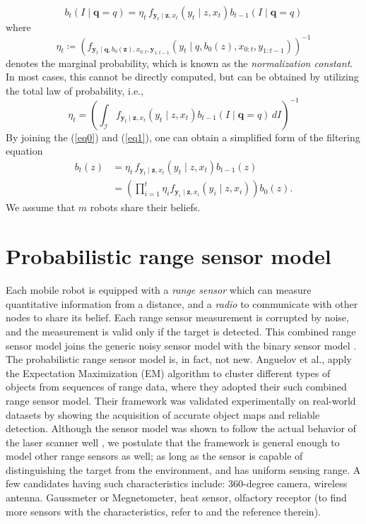 \documentclass[journal]{IEEEtran}
\begin{document}
\begin{equation}
b_{t}(I \mid \bm{q} = q)=
\eta_t\,
	f_{\bm{y}_{t} \mid
		\bm{z},{x}_{t}}\left(
	y_{t} \mid
	z,{x}_{t}\right)
	b_{t-1}(I \mid \bm{q} = q)
	\label{eq1}
\end{equation}
where
\begin{equation}
\eta_{t} \coloneqq
\left(
	f_{\bm{y}_{t} \mid
	\bm{q},
	b_0(\bm{z}),
	{x}_{0:t},\bm{y}_{1:t-1}	
}\left(
y_{t} \mid
q,b_0(z),
{x}_{0:t},y_{1:t-1}
\right)
\right)^{-1}
\nonumber
\end{equation}
denotes the marginal probability, which is known as the \emph{normalization constant}. In most cases, this cannot be directly computed, but can be obtained by utilizing the total law of probability, i.e.,
\[
\eta_{t} =
\left(\int_{\mathcal{I}}
f_{\bm{y}_{t} \mid
	\bm{z},{x}_{t}}\left(
y_{t} \mid
z,{x}_{t}\right)
b_{t-1}(I \mid \bm{q} = q)
\,dI\right)^{-1}
\]
By joining the (\ref{eq0}) and (\ref{eq1}), one can obtain a simplified form of the filtering equation
\begin{align*}
b_t(z) &=
\eta_t\,
f_{\bm{y}_{t} \mid
	\bm{z},{x}_{t}}\left(
y_{t} \mid
z,{x}_{t}\right)
b_{t-1}(z)\\
&=\left(\prod_{i=1}^t
\eta_i
f_{\bm{y}_{i} \mid
	\bm{z},{x}_{i}}\left(
y_{i} \mid
z,{x}_{i}\right) \right)
b_0(z).
\end{align*}
We assume that $m$ robots share their beliefs. 

\section{Probabilistic range sensor model}
\label{sec:sec3}
Each mobile robot is equipped with a \emph{range sensor} which can measure quantitative information from a distance, and a \emph{radio} to communicate with other nodes to share its belief. 
Each range sensor measurement is corrupted by noise, and the measurement is valid only if the target is detected. This combined range sensor model joins the generic noisy sensor model with the binary sensor model \cite{djuric2008target}.
The probabilistic range sensor model is, in fact, not new. 
Anguelov et al., \cite{anguelov2004detecting} apply the Expectation Maximization (EM) algorithm to cluster different types of objects from sequences of range data, where they adopted their such combined range sensor model. Their framework was validated experimentally on real-world datasets by showing the acquisition of accurate object maps and reliable detection. Although the sensor model was shown to follow the actual behavior of the laser scanner well \cite{anguelov2004detecting}, we postulate that the framework is general enough to model other range sensors as well; as long as the sensor is capable of distinguishing the target from the environment, and has uniform sensing range. A few candidates having such characteristics include: 360-degree camera, wireless antenna. Gaussmeter or Megnetometer, heat sensor, olfactory receptor (to find more sensors with the characteristics, refer to \cite{akyildiz2002survey} and the reference therein).
\end{document}
